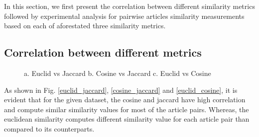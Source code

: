 \documentclass[journal,onecolumn]{IEEEtran}
\begin{document}
In this section, we first present the correlation between different similarity metrics followed by experimental analysis for pairwise articles similarity measurements based on each of aforestated three similarity metrics.

\subsection{Correlation between different metrics}

\begin{figure}[hb]
\begin{center}
\caption{  a. Euclid vs Jaccard b. Cosine vs Jaccard c. Euclid vs Cosine}
\end{center}
\end{figure}

As shown in Fig. \ref{euclid_jaccard}, \ref{cosine_jaccard} and \ref{euclid_cosine}, it is evident that for the given dataset, the cosine and jaccard have high correlation and compute similar  similarity values for most of the article pairs. Whereas, the euclidean similarity computes different similarity value for each article pair than compared to its counterparts.
 
\end{document}

